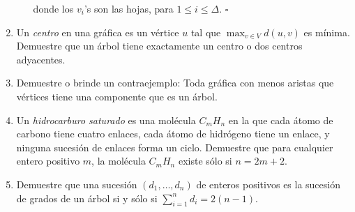 \documentclass{article}
\begin{document}
\begin{enumerate}
\begin{enumerate}
      donde los $v_i$'s son las hojas, para $1 \leq i \leq \Delta$.
      \hfill $\square$
  \end{enumerate}
    
  \item Un {\em centro} en una gr\'afica es un v\'ertice
    $u$ tal que $\max_{v \in V} d(u, v)$ es m\'inima.
    Demuestre que un \'arbol tiene exactamente un centro
    o dos centros adyacentes.
    
  \item Demuestre o brinde un contraejemplo: Toda
    gr\'afica con menos aristas que v\'ertices tiene
    una componente que es un \'arbol.
    
  \item Un {\em hidrocarburo saturado} es una
    mol\'ecula $C_mH_n$ en la que cada \'atomo de
    carbono tiene cuatro enlaces, cada
    \'atomo de hidr\'ogeno tiene un enlace, y
    ninguna sucesi\'on de enlaces forma un ciclo.
    Demuestre que para cualquier entero positivo
    $m$, la mol\'ecula $C_mH_n$ existe s\'olo si
    $n = 2m + 2$.
    
  \item Demuestre que una sucesi\'on $(d_1, \dots,
    d_n)$ de enteros positivos es la sucesi\'on de
    grados de un \'arbol si y s\'olo si
    $\sum_{i=1}^n d_i = 2(n-1)$.
    
    
\end{enumerate}
\end{document}
